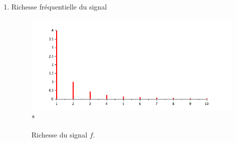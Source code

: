 \documentclass[a4paper,12pt]{report}
\begin{document}
\begin{enumerate}
\begin{enumerate}
			\item Richesse fréquentielle du signal
			\begin{figure}[h!]
				\centering
				\includegraphics[scale=0.6]{ex1_fig4_2.png}\\*
				\caption{\label{ex1_figure4_2}Richesse du signal $f$.}
			\end{figure}\\
		\end{enumerate}
		\newpage
		

\end{enumerate}
\end{document}
